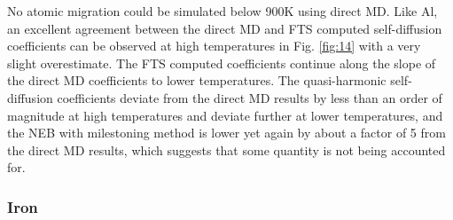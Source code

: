 \documentclass{article}
\begin{document}
No atomic migration could be simulated below 900K using direct MD. Like Al, an excellent agreement between the direct MD and FTS computed self-diffusion coefficients can be observed at high temperatures in Fig. \ref{fig:14} with a very slight overestimate. The FTS computed coefficients continue along the slope of the direct MD coefficients to lower temperatures. The quasi-harmonic self-diffusion coefficients deviate from the direct MD results by less than an order of magnitude at high temperatures and deviate further at lower temperatures, and the NEB with milestoning method is lower yet again by about a factor of 5 from the direct MD results, which suggests that some quantity is not being accounted for.

\subsubsection{Iron}
\end{document}
